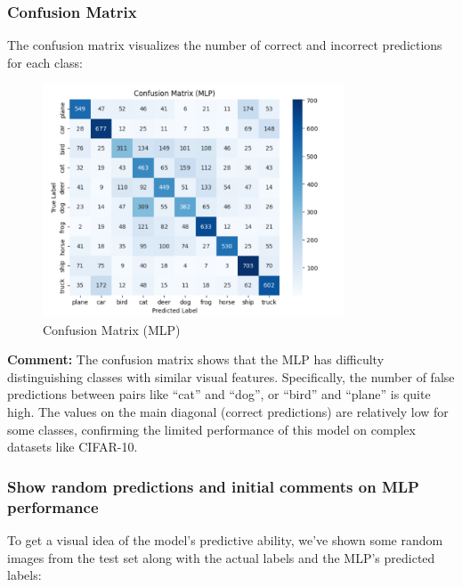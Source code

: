 \documentclass[12pt]{article}
\begin{document}
\subsubsection{Confusion Matrix}
The confusion matrix visualizes the number of correct and incorrect predictions for each class:
\begin{figure}[H]
    \centering
    \includegraphics[width=0.8\textwidth]{Screenshots/Ảnh chụp màn hình 2025-05-23 223226.png} %
    \caption{Confusion Matrix (MLP)}
    \label{fig:mlp_confusion_matrix}
\end{figure}
\textbf{Comment:} The confusion matrix shows that the MLP has difficulty distinguishing classes with similar visual features. Specifically, the number of false predictions between pairs like “cat” and “dog”, or “bird” and “plane” is quite high. The values on the main diagonal (correct predictions) are relatively low for some classes, confirming the limited performance of this model on complex datasets like CIFAR-10.

\subsubsection{Show random predictions and initial comments on MLP performance}
To get a visual idea of the model's predictive ability, we've shown some random images from the test set along with the actual labels and the MLP's predicted labels:
\end{document}
